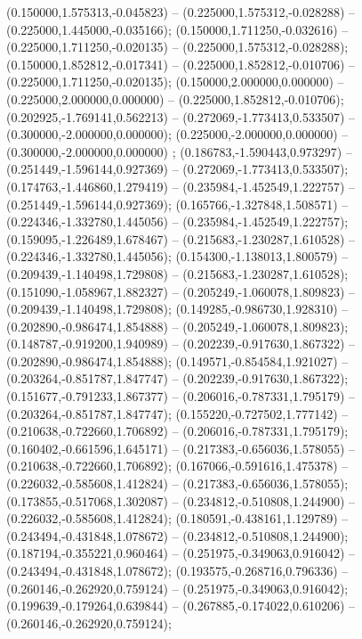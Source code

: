  (0.150000,1.575313,-0.045823) -- (0.225000,1.575312,-0.028288) -- (0.225000,1.445000,-0.035166);
 (0.150000,1.711250,-0.032616) -- (0.225000,1.711250,-0.020135) -- (0.225000,1.575312,-0.028288);
 (0.150000,1.852812,-0.017341) -- (0.225000,1.852812,-0.010706) -- (0.225000,1.711250,-0.020135);
 (0.150000,2.000000,0.000000) -- (0.225000,2.000000,0.000000) -- (0.225000,1.852812,-0.010706);
 (0.202925,-1.769141,0.562213) -- (0.272069,-1.773413,0.533507) -- (0.300000,-2.000000,0.000000);
 (0.225000,-2.000000,0.000000) -- (0.300000,-2.000000,0.000000) ;
 (0.186783,-1.590443,0.973297) -- (0.251449,-1.596144,0.927369) -- (0.272069,-1.773413,0.533507);
 (0.174763,-1.446860,1.279419) -- (0.235984,-1.452549,1.222757) -- (0.251449,-1.596144,0.927369);
 (0.165766,-1.327848,1.508571) -- (0.224346,-1.332780,1.445056) -- (0.235984,-1.452549,1.222757);
 (0.159095,-1.226489,1.678467) -- (0.215683,-1.230287,1.610528) -- (0.224346,-1.332780,1.445056);
 (0.154300,-1.138013,1.800579) -- (0.209439,-1.140498,1.729808) -- (0.215683,-1.230287,1.610528);
 (0.151090,-1.058967,1.882327) -- (0.205249,-1.060078,1.809823) -- (0.209439,-1.140498,1.729808);
 (0.149285,-0.986730,1.928310) -- (0.202890,-0.986474,1.854888) -- (0.205249,-1.060078,1.809823);
 (0.148787,-0.919200,1.940989) -- (0.202239,-0.917630,1.867322) -- (0.202890,-0.986474,1.854888);
 (0.149571,-0.854584,1.921027) -- (0.203264,-0.851787,1.847747) -- (0.202239,-0.917630,1.867322);
 (0.151677,-0.791233,1.867377) -- (0.206016,-0.787331,1.795179) -- (0.203264,-0.851787,1.847747);
 (0.155220,-0.727502,1.777142) -- (0.210638,-0.722660,1.706892) -- (0.206016,-0.787331,1.795179);
 (0.160402,-0.661596,1.645171) -- (0.217383,-0.656036,1.578055) -- (0.210638,-0.722660,1.706892);
 (0.167066,-0.591616,1.475378) -- (0.226032,-0.585608,1.412824) -- (0.217383,-0.656036,1.578055);
 (0.173855,-0.517068,1.302087) -- (0.234812,-0.510808,1.244900) -- (0.226032,-0.585608,1.412824);
 (0.180591,-0.438161,1.129789) -- (0.243494,-0.431848,1.078672) -- (0.234812,-0.510808,1.244900);
 (0.187194,-0.355221,0.960464) -- (0.251975,-0.349063,0.916042) -- (0.243494,-0.431848,1.078672);
 (0.193575,-0.268716,0.796336) -- (0.260146,-0.262920,0.759124) -- (0.251975,-0.349063,0.916042);
 (0.199639,-0.179264,0.639844) -- (0.267885,-0.174022,0.610206) -- (0.260146,-0.262920,0.759124);
